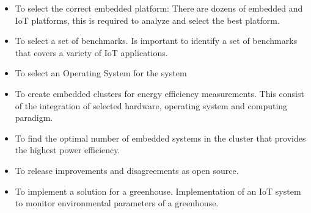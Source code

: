 \begin{itemize}

\item To select the correct embedded platform: There are dozens of embedded and
IoT platforms, this is required  to analyze and select the best platform.

\item To select a set of benchmarks. Is important to identify a set of
benchmarks that covers a variety of IoT applications.

\item To select an Operating System for the system 

\item To create embedded clusters for energy efficiency measurements. This
consist of the integration of selected hardware, operating system and computing
paradigm.

\item To find the optimal number of embedded systems in the cluster that
provides the highest power efficiency. 

\item To release improvements and disagreements as open source. 

\item To implement a solution for a greenhouse. Implementation of an IoT system
to monitor environmental parameters of a greenhouse.

\end{itemize}

\clearpage
